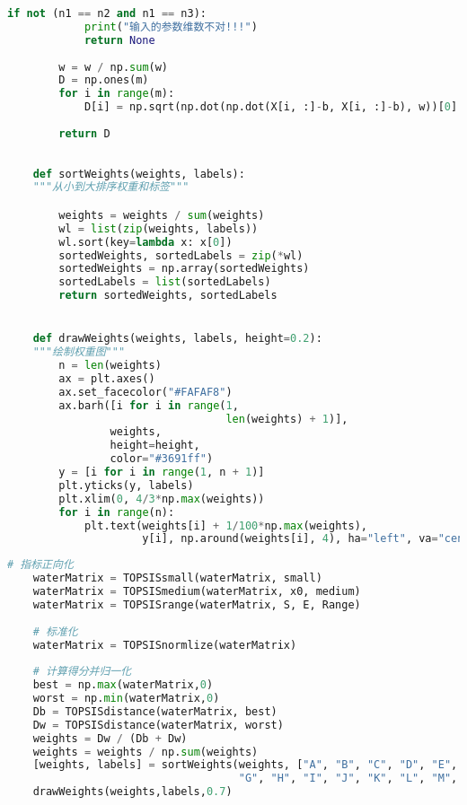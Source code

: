 \documentclass[withoutpreface]{cumcmthesis}
\begin{document}
\begin{lstlisting}[language=python ,caption={函数定义} ]
        if not (n1 == n2 and n1 == n3):
            print("输入的参数维数不对!!!")
            return None
    
        w = w / np.sum(w)
        D = np.ones(m)
        for i in range(m):
            D[i] = np.sqrt(np.dot(np.dot(X[i, :]-b, X[i, :]-b), w))[0]
            
        return D
    
    
    def sortWeights(weights, labels):
    """从小到大排序权重和标签"""

        weights = weights / sum(weights)
        wl = list(zip(weights, labels))
        wl.sort(key=lambda x: x[0])
        sortedWeights, sortedLabels = zip(*wl)
        sortedWeights = np.array(sortedWeights)
        sortedLabels = list(sortedLabels)
        return sortedWeights, sortedLabels


    def drawWeights(weights, labels, height=0.2):
    """绘制权重图"""
        n = len(weights)
        ax = plt.axes()
        ax.set_facecolor("#FAFAF8")
        ax.barh([i for i in range(1,
                                  len(weights) + 1)],
                weights,
                height=height,
                color="#3691ff")
        y = [i for i in range(1, n + 1)]
        plt.yticks(y, labels)
        plt.xlim(0, 4/3*np.max(weights))
        for i in range(n):
            plt.text(weights[i] + 1/100*np.max(weights),
                     y[i], np.around(weights[i], 4), ha="left", va="center")
    \end{lstlisting}

    \begin{lstlisting}[language=python ,caption={TOPSIS主体} ]
    # 指标正向化
    waterMatrix = TOPSISsmall(waterMatrix, small)
    waterMatrix = TOPSISmedium(waterMatrix, x0, medium)
    waterMatrix = TOPSISrange(waterMatrix, S, E, Range)
    
    # 标准化
    waterMatrix = TOPSISnormlize(waterMatrix)
    
    # 计算得分并归一化
    best = np.max(waterMatrix,0)
    worst = np.min(waterMatrix,0)
    Db = TOPSISdistance(waterMatrix, best)
    Dw = TOPSISdistance(waterMatrix, worst)
    weights = Dw / (Db + Dw)
    weights = weights / np.sum(weights)
    [weights, labels] = sortWeights(weights, ["A", "B", "C", "D", "E", "F",
                                    "G", "H", "I", "J", "K", "L", "M", "N", "O", "P", "Q", "R", "S", "T"])
    drawWeights(weights,labels,0.7)
    \end{lstlisting}
\end{document}
